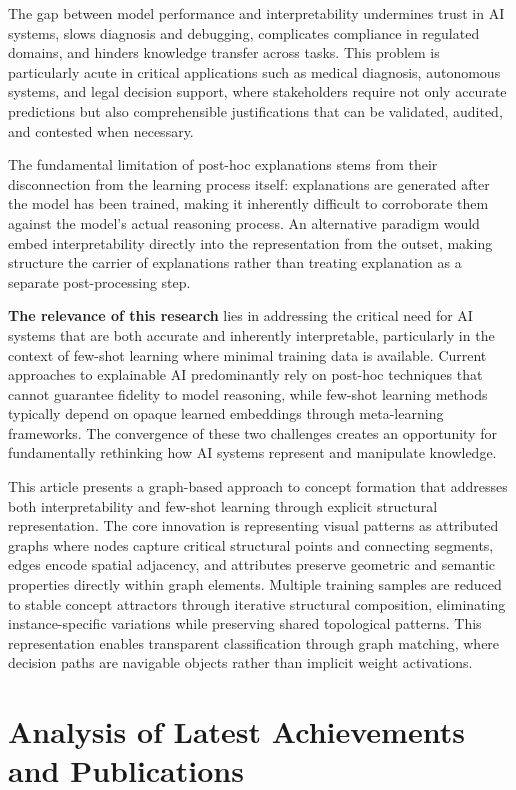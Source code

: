 \documentclass[a4paper,10pt]{article}
\begin{document}
The gap between model performance and interpretability undermines trust in AI systems, slows diagnosis and debugging, complicates compliance in regulated domains, and hinders knowledge transfer across tasks. This problem is particularly acute in critical applications such as medical diagnosis, autonomous systems, and legal decision support, where stakeholders require not only accurate predictions but also comprehensible justifications that can be validated, audited, and contested when necessary.

The fundamental limitation of post-hoc explanations stems from their disconnection from the learning process itself: explanations are generated after the model has been trained, making it inherently difficult to corroborate them against the model's actual reasoning process. An alternative paradigm would embed interpretability directly into the representation from the outset, making structure the carrier of explanations rather than treating explanation as a separate post-processing step.

\textbf{The relevance of this research} lies in addressing the critical need for AI systems that are both accurate and inherently interpretable, particularly in the context of few-shot learning where minimal training data is available. Current approaches to explainable AI predominantly rely on post-hoc techniques that cannot guarantee fidelity to model reasoning, while few-shot learning methods typically depend on opaque learned embeddings through meta-learning frameworks. The convergence of these two challenges creates an opportunity for fundamentally rethinking how AI systems represent and manipulate knowledge.

This article presents a graph-based approach to concept formation that addresses both interpretability and few-shot learning through explicit structural representation. The core innovation is representing visual patterns as attributed graphs where nodes capture critical structural points and connecting segments, edges encode spatial adjacency, and attributes preserve geometric and semantic properties directly within graph elements. Multiple training samples are reduced to stable concept attractors through iterative structural composition, eliminating instance-specific variations while preserving shared topological patterns. This representation enables transparent classification through graph matching, where decision paths are navigable objects rather than implicit weight activations.

\section{Analysis of Latest Achievements and Publications}
\end{document}
